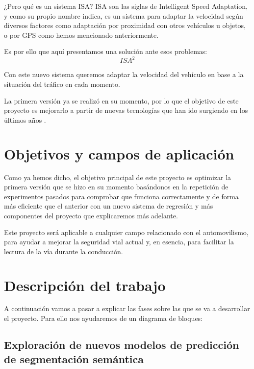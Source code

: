 \documentclass[12pt,oneside,a4paper]{article}
\begin{document}
¿Pero qué es un sistema ISA? ISA son las siglas de Intelligent Speed Adaptation, y como su propio nombre indica, es un sistema para adaptar la velocidad según diversos factores como adaptación por proximidad con otros vehículos u objetos, o por GPS como hemos mencionado anteriormente.

Es por ello que aquí presentamos una solución ante esos problemas: \[ISA^{2}\]

Con este nuevo sistema queremos adaptar la velocidad del vehículo en base a la situación del tráfico en cada momento.

La primera versión ya se realizó en su momento, por lo que el objetivo de este proyecto es mejorarlo a partir de nuevas tecnologías que han ido surgiendo en los últimos años \cite{isa2}.

\section{Objetivos y campos de aplicación}

Como ya hemos dicho, el objetivo principal de este proyecto es optimizar la primera versión que se hizo en su momento basándonos en la repetición de experimentos pasados para comprobar que funciona correctamente y de forma más eficiente que el anterior con un nuevo sistema de regresión y más componentes del proyecto que explicaremos más adelante.

Este proyecto será aplicable a cualquier campo relacionado con el automovilismo, para ayudar a mejorar la seguridad vial actual y, en esencia, para facilitar la lectura de la vía durante la conducción.

\section{Descripción del trabajo}

A continuación vamos a pasar a explicar las fases sobre las que se va a desarrollar el proyecto. Para ello nos ayudaremos de un diagrama de bloques:

\begin{center}
\end{center}
\subsection{Exploración de nuevos modelos de predicción de segmentación semántica}
\end{document}
